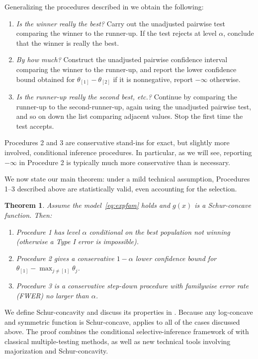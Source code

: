 \documentclass[11pt]{article}
\newtheorem{theorem}[corollary]{Theorem}
\theoremstyle{definition}
\theoremstyle{custom}
\begin{document}
Generalizing the procedures described in  we obtain the following:
\begin{enumerate}
\item {\em Is the winner really the best?} Carry out the unadjusted pairwise test comparing the winner to the runner-up. If the test rejects at level $\alpha$, conclude that the winner is really the best.
\item {\em By how much?} Construct the unadjusted pairwise confidence interval comparing the winner to the runner-up, and report the lower confidence bound obtained for $\theta_{[1]} - \theta_{[2]}$ if it is nonnegative, report $-\infty$ otherwise.
\item {\em Is the runner-up really the second best, etc.?} Continue by comparing the runner-up to the second-runner-up, again using the unadjusted pairwise test, and so on down the list comparing adjacent values. Stop the first time the test accepts.
\end{enumerate}
Procedures 2 and 3 are conservative stand-ins for exact, but slightly more involved, conditional inference procedures. In particular, as we will see, reporting $-\infty$ in Procedure 2 is typically much more conservative than is necessary.

We now state our main theorem: under a mild technical assumption, Procedures 1--3 described above are statistically valid, even accounting for the selection.
\begin{theorem}
Assume the model~\eqref{eq:expfam} holds and $g\left(x\right)$ is a Schur-concave function. Then:
\begin{enumerate}
\item Procedure 1 has level $\alpha$ conditional on the best population not winning (otherwise a Type I error is impossible).
\item Procedure 2 gives a conservative $1-\alpha$ lower confidence bound for $\theta_{[1]} - \max_{j \ne [1]} \theta_{j}$.
\item Procedure 3 is a conservative step-down procedure with familywise error rate (FWER) no larger than $\alpha$.
\end{enumerate}
\label{thm:main}
\end{theorem}

We define Schur-concavity and discuss its properties in . Because any log-concave and symmetric function is Schur-concave,  applies to all of the cases discussed above. The proof combines the conditional selective-inference framework of \citet{Fithian:2014ws} with classical multiple-testing methods, as well as new technical tools involving majorization and Schur-concavity.
\end{document}
